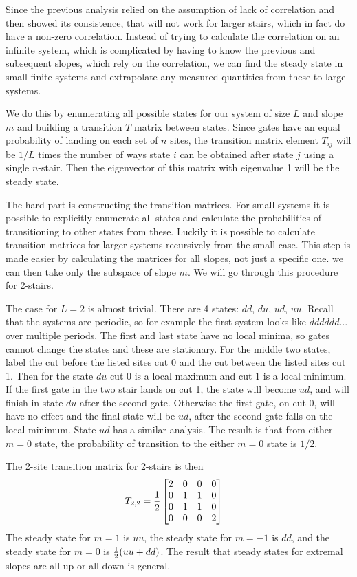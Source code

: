 Since the previous analysis relied on the assumption of lack of correlation and then showed its consistence, that will not work for larger stairs, which in fact do have a non-zero correlation. Instead of trying to calculate the correlation on an infinite system, which is complicated by having to know the previous and subsequent slopes, which rely on the correlation, we can find the steady state in small finite systems and extrapolate any measured quantities from these to large systems.

We do this by enumerating all possible states for our system of size $L$ and slope $m$ and building a transition $T$ matrix between states. Since gates have an equal probability of landing on each set of $n$ sites, the transition matrix element $T_{ij}$ will be $1/L$ times the number of ways state $i$ can be obtained after state $j$ using a single $n$-stair. Then the eigenvector of this matrix with eigenvalue 1 will be the steady state.

The hard part is constructing the transition matrices. For small systems it is possible to explicitly enumerate all states and calculate the probabilities of transitioning to other states from these. Luckily it is possible to calculate transition matrices for larger systems recursively from the small case. This step is made easier by calculating the matrices for all slopes, not just a specific one. we can then take only the subspace of slope $m$. We will go through this procedure for 2-stairs.

The case for $L=2$ is almost trivial. There are 4 states: $dd$, $du$, $ud$, $uu$. Recall that the systems are periodic, so for example the first system looks like $dddddd\dots$ over multiple periods. The first and last state have no local minima, so gates cannot change the states and these are stationary. For the middle two states, label the cut before the listed sites cut 0 and the cut between the listed sites cut 1. Then for the state $du$ cut 0 is a local maximum and cut 1 is a local minimum. If the first gate in the two stair lands on cut 1, the state will become $ud$, and will finish in state $du$ after the second gate. Otherwise the first gate, on cut 0, will have no effect and the final state will be $ud$, after the second gate falls on the local minimum. State $ud$ has a similar analysis. The result is that from either $m=0$ state, the probability of transition to the either $m=0$ state is $1/2$.

The 2-site transition matrix for 2-stairs is then 
\begin{align}
T_{2,2} &= 
\frac{1}{2} \begin{bmatrix}
	2 & 0 & 0 & 0 \\
	0 & 1 & 1 & 0 \\
	0 & 1 & 1 & 0 \\
	0 & 0 & 0 & 2
	\end{bmatrix}
\end{align}
The steady state for $m=1$ is $uu$, the steady state for $m=-1$ is $dd$, and the steady state for $m=0$ is $\frac{1}{2}(uu+dd)$. The result that steady states for extremal slopes are all up or all down is general.

